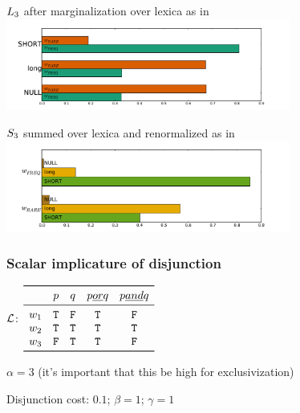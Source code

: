 \documentclass{article}
\begin{document}
\begin{examples}
\item $\ListenerK[3]$ after marginalization over lexica as in  \\
  \includegraphics[width=0.7\textwidth]{fig/manner-expertise-listener-marginalized}

\item $\SpeakerK[3]$ summed over lexica and renormalized as in  \\
  \includegraphics[width=0.7\textwidth]{fig/manner-expertise-speaker-lexsum}
\end{examples}

\newpage

\subsubsection{Scalar implicature of disjunction}\label{sec:scalar-disj}


\begin{examples}
\item 
  \begin{examples}
  \item 
    $\Lex$:
    $\begin{array}[c]{r *{4}{c}}
      \toprule
                    & p      & q      & p \word{ or } q & p \word{ and } q \\
      \midrule
      w_{1}          & \True    & \False & \True     & \False \\
      w_{2}          & \True    & \True  & \True     & \True  \\
      w_{3}           & \False  & \True  & \True     & \False \\
      \bottomrule
    \end{array}$
  \item $\alpha = 3$ (it's important that this be high for exclusivization)
  \item Disjunction cost: $0.1$; $\beta = 1$; $\gamma = 1$  
  \end{examples}
\end{examples}
\end{document}
